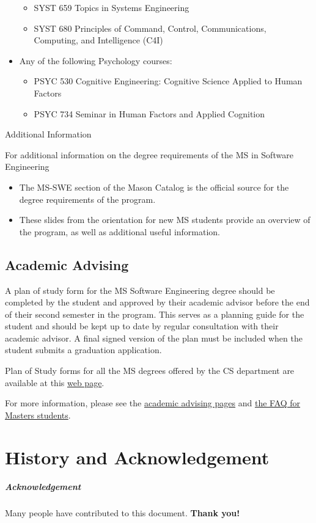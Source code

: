 \documentclass[oneside,11pt]{memoir}
\begin{document}
\begin{itemize}
\begin{itemize}
        \item SYST 659 Topics in Systems Engineering
        \item SYST 680 Principles of Command, Control, Communications, Computing, and Intelligence (C4I)
\end{itemize}        
    \item Any of the following Psychology courses:
    \begin{itemize}
        \item PSYC 530 Cognitive Engineering: Cognitive Science Applied to Human Factors
        \item PSYC 734 Seminar in Human Factors and Applied Cognition
\end{itemize}        
\end{itemize}
Additional Information

For additional information on the degree requirements of the MS in Software Engineering
\begin{itemize}
    \item The MS-SWE section of the Mason Catalog is the official source for the degree requirements of the program.
    \item These slides from the orientation for new MS students provide an overview of the program, as well as additional useful information.
\end{itemize}

\section{Academic Advising}

A plan of study form for the MS Software Engineering degree should be completed by the student and approved by their academic advisor before the end of their second semester in the program. This serves as a planning guide for the student and should be kept up to date by regular consultation with their academic advisor. A final signed version of the plan must be included when the student submits a graduation application.

Plan of Study forms for all the MS degrees offered by the CS department are available at this \href{https://cs.gmu.edu/resources/student-forms/}{web page}.

For more information, please see the \href{https://cs.gmu.edu/current-students/ms-students/advising/}{academic advising pages} and \href{https://cs.gmu.edu/current-students/ms-students/faqs/}{the FAQ for Masters students}.


\chapter{History and Acknowledgement}\label{sec:ack}


\paragraph{Acknowledgement} Many people have contributed to this document.
\textbf{Thank you!}



\end{document}
